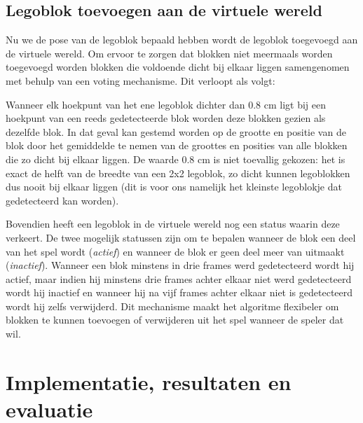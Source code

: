 \subsection{Legoblok toevoegen aan de virtuele wereld} \label{sec:naive_algo_3}

Nu we de pose van de legoblok bepaald hebben wordt de legoblok toegevoegd aan de virtuele wereld. Om ervoor te zorgen dat blokken niet meermaals worden toegevoegd worden blokken die voldoende dicht bij elkaar liggen samengenomen met behulp van een voting mechanisme. Dit verloopt als volgt:

Wanneer elk hoekpunt van het ene legoblok dichter dan 0.8 cm ligt bij een hoekpunt van een reeds gedetecteerde blok worden deze blokken gezien als dezelfde blok. In dat geval kan gestemd worden op de grootte en positie van de blok door het gemiddelde te nemen van de groottes en posities van alle blokken die zo dicht bij elkaar liggen. De waarde 0.8 cm is niet toevallig gekozen: het is exact de helft van de breedte van een 2x2 legoblok, zo dicht kunnen legoblokken dus nooit bij elkaar liggen (dit is voor ons namelijk het kleinste legoblokje dat gedetecteerd kan worden).

Bovendien heeft een legoblok in de virtuele wereld nog een status waarin deze verkeert. De twee mogelijk statussen zijn om te bepalen wanneer de blok een deel van het spel wordt (\textit{actief}) en wanneer de blok er geen deel meer van uitmaakt (\textit{inactief}). Wanneer een blok minstens in drie frames werd gedetecteerd wordt hij actief, maar indien hij minstens drie frames achter elkaar niet werd gedetecteerd wordt hij inactief en wanneer hij na vijf frames achter elkaar niet is gedetecteerd wordt hij zelfs verwijderd. Dit mechanisme maakt het algoritme flexibeler om blokken te kunnen toevoegen of verwijderen uit het spel wanneer de speler dat wil.

\section{Implementatie, resultaten en evaluatie} \label{sec:naive_algo_result}

